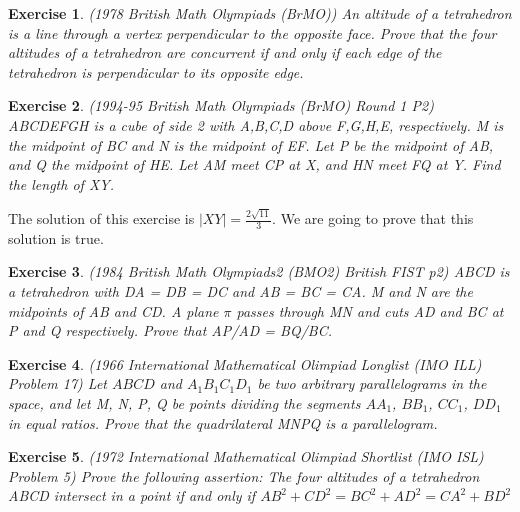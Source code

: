 \documentclass{article}
\newtheorem{z}{Exercise}
\begin{document}
    \begin{z} \textup{(1978 British Math Olympiads (BrMO))}
        An altitude of a tetrahedron is a line through a vertex perpendicular to the opposite face. Prove that the four altitudes of a tetrahedron are concurrent if and only if each edge of the tetrahedron is perpendicular to its opposite edge.
    \end{z}

    \begin{z} \textup{(1994-95 British Math Olympiads (BrMO) Round 1 P2)}
        \textup{ABCDEFGH} is a cube of side \textup{2} with \textup{A,B,C,D} above \textup{F,G,H,E}, respectively.
        \textup{M} is the midpoint of \textup{BC} and \textup{N} is the midpoint of \textup{EF}.
        Let \textup{P} be the midpoint of \textup{AB}, and \textup{Q} the midpoint of \textup{HE}. 
        Let \textup{AM} meet \textup{CP} at \textup{X}, and \textup{HN} meet \textup{FQ} at \textup{Y}. Find the length of \textup{XY}.
    \end{z}
    The solution of this exercise is $|XY| = \frac{2\sqrt{11}}{3}$. We are going to prove that this solution is true.

    \begin{z} \textup{(1984 British Math Olympiads2 (BMO2) British FIST p2)}
        \textup{ABCD} is a tetrahedron with \textup{DA = DB = DC} and \textup{AB = BC = CA}. 
        \textup{M} and \textup{N} are the midpoints of \textup{AB} and \textup{CD}. A plane $\pi$ passes through 
        \textup{MN} and cuts \textup{AD} and \textup{BC} at \textup{P} and \textup{Q} respectively.
        Prove that \textup{AP/AD = BQ/BC}.
    \end{z}

    \begin{z} \textup{(1966 International Mathematical Olimpiad Longlist (IMO ILL) Problem 17)}
        Let $ABCD$ and $A_1B_1C_1D_1$ be two arbitrary parallelograms in the space, 
        and let M, N, P, Q be points dividing the segments $AA_1$, $BB_1$, $CC_1$, $DD_1$ in equal ratios.
        Prove that the quadrilateral MNPQ is a parallelogram.
    \end{z}

    \begin{z} \textup{(1972 International Mathematical Olimpiad Shortlist (IMO ISL) Problem 5)}
        Prove the following assertion: The four altitudes of a tetrahedron ABCD intersect in a point if and only if 
        $AB^2 + CD^2 = BC^2 + AD^2 = CA^2 + BD^2$
    \end{z}
\end{document}
